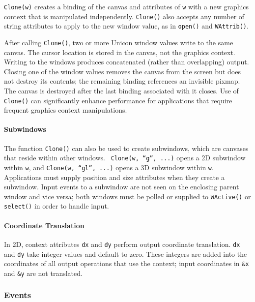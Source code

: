 \texttt{Clone(w)} creates a binding of the canvas and attributes
of \texttt{w} with a new graphics context that is manipulated
independently. \texttt{Clone()} also accepts any number
of string attributes to apply to the new window value, as in
\texttt{open()} and \texttt{WAttrib()}.

After calling \texttt{Clone()}, two or more Unicon window values
write to the same canvas. The cursor location is stored in the
canvas, not the graphics context. Writing to the windows produces
concatenated (rather than overlapping) output. Closing one of the
window values removes the canvas from the screen but does not destroy
its contents; the remaining binding references an invisible pixmap.
The canvas is destroyed after the last binding associated with it
closes. Use of \texttt{Clone()} can significantly enhance performance
for applications that require frequent graphics context manipulations.

\paragraph{Subwindows}
The function \texttt{Clone()} can also be used to create subwindows,
which are canvases that reside within other windows.
\ \texttt{Clone(w, {\textquotedblleft}g{\textquotedblright}, ...)}
opens a 2D subwindow within \texttt{w}, and \texttt{Clone(w,
{\textquotedblleft}gl{\textquotedblright}, ...)} opens a 3D subwindow
within \texttt{w}. Applications must supply position and size
attributes when they create a subwindow. Input events
to a subwindow are not seen on the enclosing parent window and vice
versa; both windows must be polled or supplied to \texttt{WActive()} or
\texttt{select()} in order to handle input.

\paragraph{Coordinate Translation}
In 2D, context attributes \texttt{dx} and \texttt{dy} perform output
coordinate translation. \texttt{dx} and \texttt{dy} take integer values
and default to zero. These integers are added into the coordinates of
all output operations that use the context; input coordinates in
\texttt{\&x} and \texttt{\&y} are not translated.

\subsubsection{Events}

